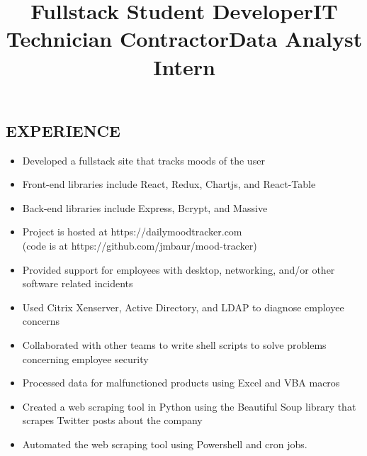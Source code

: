 \documentclass[margin]{res}
\begin{document}
\begin{resume}
\section{EXPERIENCE}

\title{\textbf{Fullstack Student Developer}}
\begin{position}
    \begin{itemize}
        \item Developed a fullstack site that tracks moods of the user
        \item Front-end libraries include React, Redux, Chartjs, and React-Table
        \item Back-end libraries include Express, Bcrypt, and Massive
        \item Project is hosted at https://dailymoodtracker.com\\(code is at https://github.com/jmbaur/mood-tracker)
    \end{itemize}
\end{position}

\title{\textbf{IT Technician} Contractor}
\begin{position}
	\begin{itemize}
        \item Provided support for employees with desktop, networking, and/or other software related incidents
        \item Used Citrix Xenserver, Active Directory, and LDAP to diagnose employee concerns
        \item Collaborated with other teams to write shell scripts to solve problems concerning employee security
	\end{itemize}
\end{position}

\title{\textbf{Data Analyst} Intern}
\begin{position}
	\begin{itemize}
        \item Processed data for malfunctioned products using Excel and VBA macros
        \item Created a web scraping tool in Python using the Beautiful Soup library that scrapes Twitter posts about the company
        \item Automated the web scraping tool using Powershell and cron jobs.
	\end{itemize}
\end{position}


\end{resume}
\end{document}
